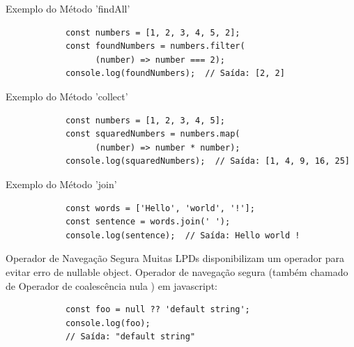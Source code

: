 \documentclass{beamer}
\begin{document}
\begin{frame}[fragile]{Exemplo do Método 'findAll'}
	\begin{verbatim}
            const numbers = [1, 2, 3, 4, 5, 2];
            const foundNumbers = numbers.filter(
                  (number) => number === 2);
            console.log(foundNumbers);  // Saída: [2, 2]
            \end{verbatim}
\end{frame}

\begin{frame}[fragile]{Exemplo do Método 'collect'}\justifying
	\begin{verbatim}
            const numbers = [1, 2, 3, 4, 5];
            const squaredNumbers = numbers.map(
                  (number) => number * number);
            console.log(squaredNumbers);  // Saída: [1, 4, 9, 16, 25]
            \end{verbatim}
\end{frame}

\begin{frame}[fragile]{Exemplo do Método 'join'}\justifying
	\begin{verbatim}
            const words = ['Hello', 'world', '!'];
            const sentence = words.join(' ');
            console.log(sentence);  // Saída: Hello world !
            \end{verbatim}
\end{frame}

\begin{frame}[fragile]{Operador de Navegação Segura}\justifying
	Muitas LPDs disponibilizam um operador para evitar erro de nullable object.
	Operador de navegação segura (também chamado de Operador de coalescência nula
	) em javascript:
	\begin{verbatim}
            const foo = null ?? 'default string';
            console.log(foo);
            // Saída: "default string"
            
      \end{verbatim}
\end{frame}
\end{document}
